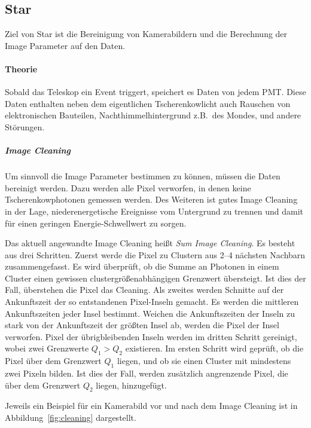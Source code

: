 \subsection{Star}%
\label{sub:star}
Ziel von Star ist die Bereinigung von Kamerabildern und die Berechnung
der Image Parameter auf den Daten.

\paragraph{Theorie}
Sobald das Teleskop ein Event triggert,
speichert es Daten von jedem PMT.\@
Diese Daten enthalten neben dem eigentlichen Tscherenkowlicht auch
Rauschen von elektronischen Bauteilen,
Nachthimmelhintergrund  z.B.\ des Mondes,
und andere Störungen.

\subparagraph{Image Cleaning}
Um sinnvoll die Image Parameter bestimmen zu können,
müssen die Daten bereinigt werden.
Dazu werden alle Pixel verworfen, in denen keine
Tscherenkowphotonen gemessen werden.
Des Weiteren ist gutes Image Cleaning in der Lage,
niederenergetische Ereignisse vom Untergrund zu trennen und damit
für einen geringen Energie-Schwellwert zu sorgen.

Das aktuell angewandte Image Cleaning heißt \textit{Sum Image Cleaning}.
Es besteht aus drei Schritten.
Zuerst werde die Pixel zu Clustern aus 2--4 nächsten Nachbarn zusammengefasst.
Es wird überprüft, ob die Summe an Photonen in einem Cluster
einen gewissen clustergrößenabhängigen Grenzwert übersteigt.
Ist dies der Fall, überstehen die Pixel das Cleaning.
Als zweites werden Schnitte auf der Ankunftszeit der so entstandenen
Pixel-Inseln gemacht.
Es werden die mittleren Ankunftszeiten jeder Insel bestimmt.
Weichen die Ankunftszeiten der Inseln zu stark von der Ankunftszeit der größten Insel ab,
werden die Pixel der Insel verworfen.
Pixel der übrigbleibenden Inseln werden im dritten Schritt gereinigt,
wobei zwei Grenzwerte $Q_{1} > Q_{2}$ existieren.
Im ersten Schritt wird geprüft,
ob die Pixel über dem
Grenzwert $Q_{1}$ liegen,
und ob sie einen Cluster mit mindestens zwei Pixeln bilden.
Ist dies der Fall,
werden zusätzlich angrenzende Pixel,
die über dem Grenzwert $Q_{2}$ liegen,
hinzugefügt.

Jeweils ein Beispiel für ein Kamerabild vor und nach dem Image Cleaning ist in
Abbildung~\ref{fig:cleaning} dargestellt.

